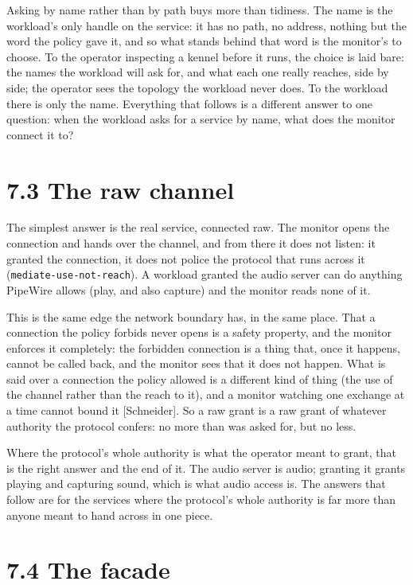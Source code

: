 Asking by name rather than by path buys more than tidiness. The name is
the workload's only handle on the service: it has no path, no address,
nothing but the word the policy gave it, and so what stands behind that
word is the monitor's to choose. To the operator inspecting a kennel
before it runs, the choice is laid bare: the names the workload will ask
for, and what each one really reaches, side by side; the operator sees
the topology the workload never does. To the workload there is only the
name. Everything that follows is a different answer to one question:
when the workload asks for a service by name, what does the monitor
connect it to?

\hypertarget{the-raw-channel}{%
\section{7.3 The raw channel}\label{the-raw-channel}}

The simplest answer is the real service, connected raw. The monitor
opens the connection and hands over the channel, and from there it does
not listen: it granted the connection, it does not police the protocol
that runs across it (\texttt{mediate-use-not-reach}). A workload granted
the audio server can do anything PipeWire allows (play, and also
capture) and the monitor reads none of it.

This is the same edge the network boundary has, in the same place. That
a connection the policy forbids never opens is a safety property, and
the monitor enforces it completely: the forbidden connection is a thing
that, once it happens, cannot be called back, and the monitor sees that
it does not happen. What is said over a connection the policy allowed is
a different kind of thing (the use of the channel rather than the reach
to it), and a monitor watching one exchange at a time cannot bound it
{[}Schneider{]}. So a raw grant is a raw grant of whatever authority the
protocol confers: no more than was asked for, but no less.

Where the protocol's whole authority is what the operator meant to
grant, that is the right answer and the end of it. The audio server is
audio; granting it grants playing and capturing sound, which is what
audio access is. The answers that follow are for the services where the
protocol's whole authority is far more than anyone meant to hand across
in one piece.

\hypertarget{the-facade}{%
\section{7.4 The facade}\label{the-facade}}

